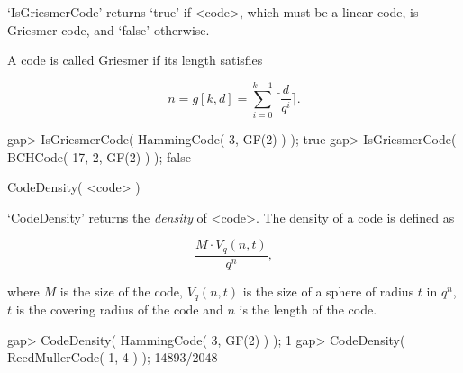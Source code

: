 `IsGriesmerCode' returns `true' if <code>, which must be a linear code,
is Griesmer code, and `false' otherwise.

A code is called Griesmer if its length satisfies

$$
n = g[k,d] = \sum_{i=0}^{k-1} \lceil \frac{d}{q^i} \rceil.
$$

\beginexample
gap> IsGriesmerCode( HammingCode( 3, GF(2) ) );
true
gap> IsGriesmerCode( BCHCode( 17, 2, GF(2) ) );
false 
\endexample

\>CodeDensity( <code> )

`CodeDensity' returns the {\it density} of <code>.
The density of a code is defined as

$$
\frac{M \cdot V_q(n,t)}{q^n},
$$

where $M$ is the size of the code, $V_q(n,t)$ is the size of a sphere  of
radius $t$ in $q^n$, $t$ is the covering radius of the code  and  $n$  is
the length of the code.

\beginexample
gap> CodeDensity( HammingCode( 3, GF(2) ) );
1
gap> CodeDensity( ReedMullerCode( 1, 4 ) );
14893/2048 
\endexample

